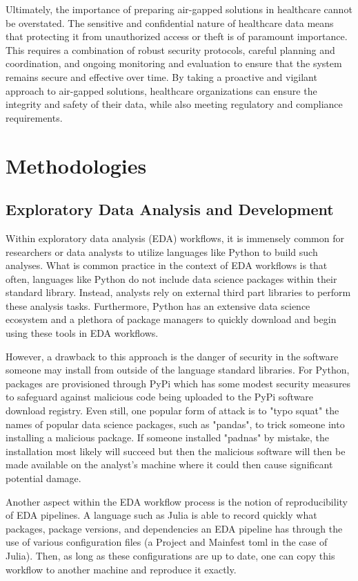 \documentclass{amia}
\begin{document}
Ultimately, the importance of preparing air-gapped solutions in healthcare cannot be overstated. The sensitive and confidential nature of healthcare data means that protecting it from unauthorized access or theft is of paramount importance. This requires a combination of robust security protocols, careful planning and coordination, and ongoing monitoring and evaluation to ensure that the system remains secure and effective over time. By taking a proactive and vigilant approach to air-gapped solutions, healthcare organizations can ensure the integrity and safety of their data, while also meeting regulatory and compliance requirements.

\section{Methodologies}

\subsection{Exploratory Data Analysis and Development}

Within exploratory data analysis (EDA) workflows, it is immensely common for researchers or data analysts to utilize languages like Python to build such analyses.
What is common practice in the context of EDA workflows is that often, languages like Python do not include data science packages within their standard library.
Instead, analysts rely on external third part libraries to perform these analysis tasks.
Furthermore, Python has an extensive data science ecosystem and a plethora of package managers to quickly download and begin using these tools in EDA workflows.

However, a drawback to this approach is the danger of security in the software someone may install from outside of the language standard libraries.
For Python, packages are provisioned through PyPi which has some modest security measures to safeguard against malicious code being uploaded to the PyPi software download registry.
Even still, one popular form of attack is to "typo squat" the names of popular data science packages, such as "pandas", to trick someone into installing a malicious package.
If someone installed "padnas" by mistake, the installation most likely will succeed but then the malicious software will then be made available on the analyst's machine where it could then cause significant potential damage.

Another aspect within the EDA workflow process is the notion of reproducibility of EDA pipelines.
A language such as Julia is able to record quickly what packages, package versions, and dependencies an EDA pipeline has through the use of various configuration files (a Project and Mainfest toml in the case of Julia). 
Then, as long as these configurations are up to date, one can copy this workflow to another machine and reproduce it exactly. 
\end{document}
